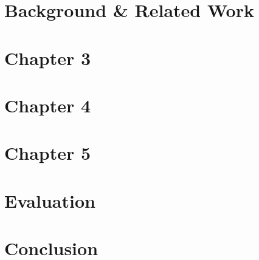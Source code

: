 \documentclass[11pt,a4paper,abstractoff,titlepage,final,parskip=half*,BCOR10mm,appendixprefix=true]{scrreprt}%
\begin{document}


\chapter{Background \& Related Work}    %
\label{chap_Background}



\chapter{Chapter 3}    %
\label{chap_3}



\chapter{Chapter 4}    %
\label{chap_4}



\chapter{Chapter 5}    %
\label{chap_5}



\chapter{Evaluation}    %
\label{chap_eval}



\chapter{Conclusion}    %
\label{chap_conc}



% 




\thispagestyle{empty}
\cleardoublepage



% 
\end{document}
